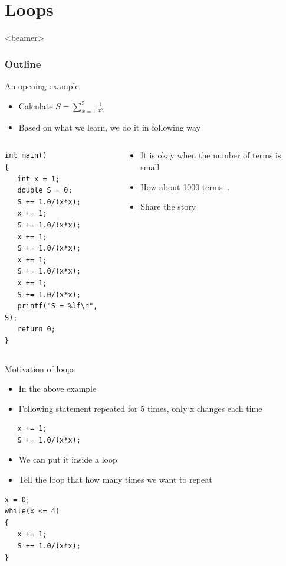 \section{Loops}
\label{sec:loops}
\begin{frame}<beamer>
    \frametitle{Outline}
    \tableofcontents[currentsection]
\end{frame}

\begin{frame}[fragile]{An opening example}
\begin{itemize}
	\item {Calculate $S=\sum_{x=1}^5\frac{1}{x^2}$}
	\item {Based on what we learn, we do it in following way}
\end{itemize}
\vspace{-0.15in}
\begin{columns}
\begin{column}{0.5\linewidth}
\begin{lstlisting}
int main()
{
   int x = 1;
   double S = 0;
   S += 1.0/(x*x);
   x += 1;
   S += 1.0/(x*x);
   x += 1;
   S += 1.0/(x*x);
   x += 1;
   S += 1.0/(x*x);
   x += 1;
   S += 1.0/(x*x);
   printf("S = %lf\n", S);
   return 0;
}
\end{lstlisting}
\end{column}
\begin{column}{0.45\linewidth}
\begin{itemize}
	\item {It is okay when the number of terms is small}
	\item {How about 1000 terms ...}
	\item {Share the story}
\end{itemize}
\end{column}
\end{columns}

\end{frame}


\begin{frame}[fragile]{Motivation of loops}
\begin{itemize}
	\item {In the above example}
	\item {Following statement repeated for 5 times, only x changes each time}
\end{itemize}
\vspace{-0.15in}
\begin{lstlisting}
   x += 1;
   S += 1.0/(x*x);
\end{lstlisting}
\vspace{-0.1in}
\begin{itemize}
	\item {We can put it inside a loop}
	\item {Tell the loop that how many times we want to repeat}
\end{itemize}
\vspace{-0.05in}
\begin{lstlisting}
x = 0;
while(x <= 4)
{
   x += 1;
   S += 1.0/(x*x);
}
\end{lstlisting}
\end{frame}

